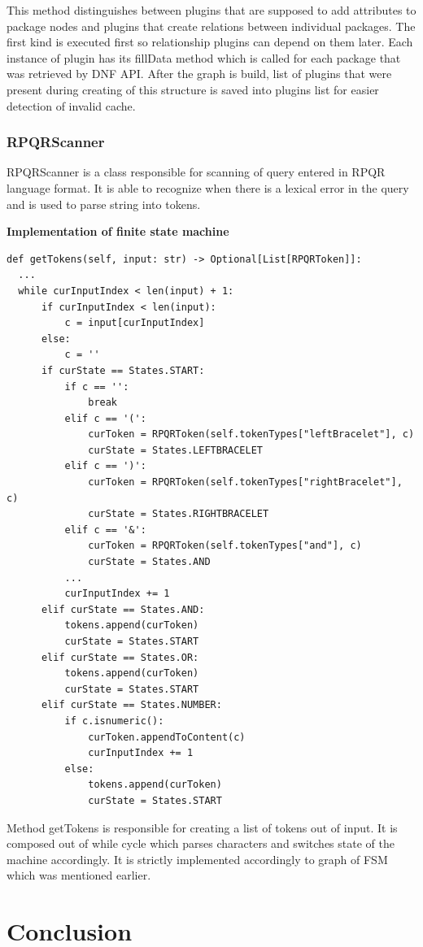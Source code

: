 This method distinguishes between plugins that are supposed to add attributes to package nodes and
plugins that create relations between individual packages. The first kind is executed first so
relationship plugins can depend on them later. Each instance of plugin has its fillData method
which is called for each package that was retrieved by DNF API. After the graph is build, list
of plugins that were present during creating of this structure is saved into plugins list for easier
detection of invalid cache.

\subsection*{RPQRScanner}
RPQRScanner is a class responsible for scanning of query entered in RPQR language format. It is able
to recognize when there is a lexical error in the query and is used to parse string into tokens.

\textbf{Implementation of finite state machine}

\begin{lstlisting}
def getTokens(self, input: str) -> Optional[List[RPQRToken]]:
  ...
  while curInputIndex < len(input) + 1:
      if curInputIndex < len(input):
          c = input[curInputIndex]
      else:
          c = ''
      if curState == States.START:
          if c == '':
              break
          elif c == '(':
              curToken = RPQRToken(self.tokenTypes["leftBracelet"], c)
              curState = States.LEFTBRACELET
          elif c == ')':
              curToken = RPQRToken(self.tokenTypes["rightBracelet"], c)
              curState = States.RIGHTBRACELET
          elif c == '&':
              curToken = RPQRToken(self.tokenTypes["and"], c)
              curState = States.AND
          ...
          curInputIndex += 1
      elif curState == States.AND:
          tokens.append(curToken)
          curState = States.START
      elif curState == States.OR:
          tokens.append(curToken)
          curState = States.START
      elif curState == States.NUMBER:
          if c.isnumeric():
              curToken.appendToContent(c)
              curInputIndex += 1
          else:
              tokens.append(curToken)
              curState = States.START
\end{lstlisting}

Method getTokens is responsible for creating a list of tokens out of input. It is composed out of
while cycle which parses characters and switches state of the machine accordingly. It is strictly
implemented accordingly to graph of FSM which was mentioned earlier.

\chapter{Conclusion}

\blindtext